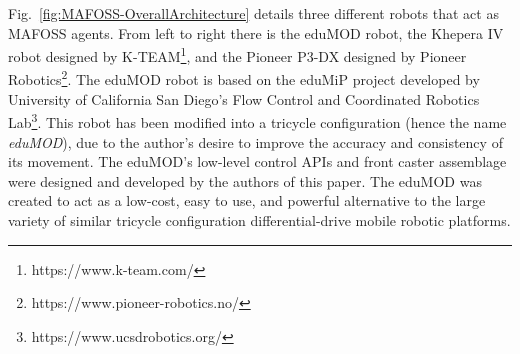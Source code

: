 Fig.~\ref{fig:MAFOSS-OverallArchitecture} details three different robots that act as MAFOSS agents. From left to right there is the eduMOD robot, the Khepera IV robot designed by K-TEAM\footnote{https://www.k-team.com/}, and the Pioneer P3-DX designed by Pioneer Robotics\footnote{https://www.pioneer-robotics.no/}. The eduMOD robot is based on the eduMiP project developed by University of California San Diego's Flow Control and Coordinated Robotics Lab\footnote{https://www.ucsdrobotics.org/}. This robot has been modified into a tricycle configuration (hence the name \emph{eduMOD}), due to the author's desire to improve the accuracy and consistency of its movement. The eduMOD's low-level control APIs and front caster assemblage were designed and developed by the authors of this paper. The eduMOD was created to act as a low-cost, easy to use, and powerful alternative to the large variety of similar tricycle configuration differential-drive mobile robotic platforms.
%
